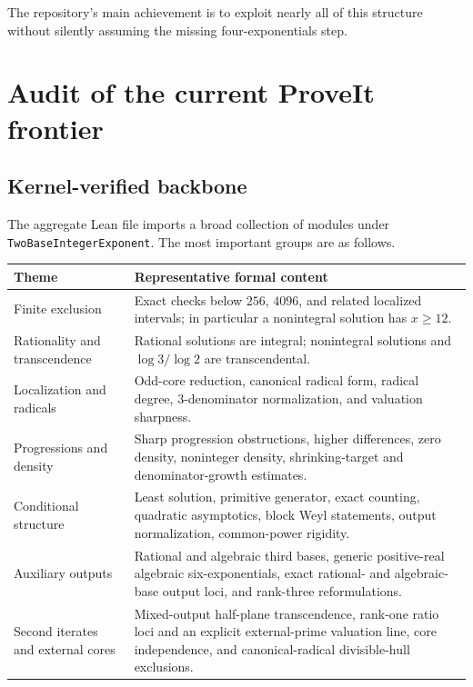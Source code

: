 \documentclass[11pt,oneside]{article}
\theoremstyle{definition}
\theoremstyle{remark}
\begin{document}
The repository's main achievement is to exploit nearly all of this structure without
silently assuming the missing four-exponentials step.

\section{Audit of the current ProveIt frontier}

\subsection{Kernel-verified backbone}

The aggregate Lean file imports a broad collection of modules under
\texttt{TwoBaseIntegerExponent}.  The most important groups are as follows.

\begin{longtable}{@{}>{\raggedright\arraybackslash}p{}>{\raggedright\arraybackslash}p{}@{}}
\toprule
Theme & Representative formal content \\
\midrule
\endhead
Finite exclusion & Exact checks below $256$, $4096$, and related localized intervals; in
particular a nonintegral solution has $x\ge 12$. \\
Rationality and transcendence & Rational solutions are integral; nonintegral solutions and
$\log 3/\log 2$ are transcendental. \\
Localization and radicals & Odd-core reduction, canonical radical form, radical degree,
$3$-denominator normalization, and valuation sharpness. \\
Progressions and density & Sharp progression obstructions, higher differences, zero density,
noninteger density, shrinking-target and denominator-growth estimates. \\
Conditional structure & Least solution, primitive generator, exact counting, quadratic
asymptotics, block Weyl statements, output normalization, common-power rigidity. \\
Auxiliary outputs & Rational and algebraic third bases, generic positive-real algebraic
six-exponentials, exact rational- and algebraic-base output loci, and rank-three
reformulations. \\
Second iterates and external cores & Mixed-output half-plane transcendence, rank-one ratio
loci and an explicit external-prime valuation line, core independence, and canonical-radical
divisible-hull exclusions. \\
\bottomrule
\end{longtable}
\end{document}
